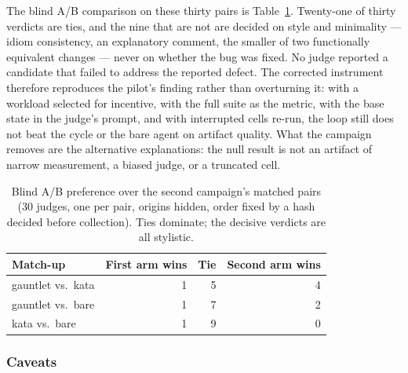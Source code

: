 \documentclass[11pt]{article}
\begin{document}
The blind A/B comparison on these thirty pairs is
Table~\ref{tab:gauntlet-ab-campaign}. Twenty-one of thirty verdicts are ties,
and the nine that are not are decided on style and minimality --- idiom
consistency, an explanatory comment, the smaller of two functionally
equivalent changes --- never on whether the bug was fixed. No judge reported a
candidate that failed to address the reported defect. The corrected instrument
therefore reproduces the pilot's finding rather than overturning it: with a
workload selected for incentive, with the full suite as the metric, with the
base state in the judge's prompt, and with interrupted cells re-run, the loop
still does not beat the cycle or the bare agent on artifact quality. What the
campaign removes are the alternative explanations: the null result is not an
artifact of narrow measurement, a biased judge, or a truncated cell.

\begin{table}[!ht]
\caption{Blind A/B preference over the second campaign's matched pairs (30
judges, one per pair, origins hidden, order fixed by a hash decided before
collection). Ties dominate; the decisive verdicts are all stylistic.}
\centering
\footnotesize
\begin{tabular}{@{}lrrr@{}}
\toprule
Match-up & First arm wins & Tie & Second arm wins \\
\midrule
gauntlet vs.\ kata & 1 & 5 & 4 \\
gauntlet vs.\ bare & 1 & 7 & 2 \\
kata vs.\ bare & 1 & 9 & 0 \\
\bottomrule
\end{tabular}
\label{tab:gauntlet-ab-campaign}
\end{table}

\subsubsection{Caveats}
\end{document}
